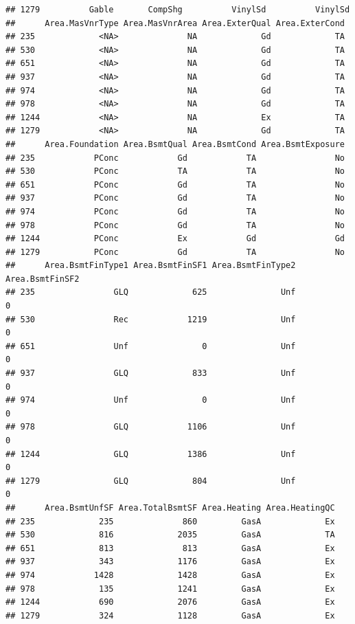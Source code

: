\documentclass[]{article}
\begin{document}
\begin{verbatim}
## 1279          Gable       CompShg          VinylSd          VinylSd
##      Area.MasVnrType Area.MasVnrArea Area.ExterQual Area.ExterCond
## 235             <NA>              NA             Gd             TA
## 530             <NA>              NA             Gd             TA
## 651             <NA>              NA             Gd             TA
## 937             <NA>              NA             Gd             TA
## 974             <NA>              NA             Gd             TA
## 978             <NA>              NA             Gd             TA
## 1244            <NA>              NA             Ex             TA
## 1279            <NA>              NA             Gd             TA
##      Area.Foundation Area.BsmtQual Area.BsmtCond Area.BsmtExposure
## 235            PConc            Gd            TA                No
## 530            PConc            TA            TA                No
## 651            PConc            Gd            TA                No
## 937            PConc            Gd            TA                No
## 974            PConc            Gd            TA                No
## 978            PConc            Gd            TA                No
## 1244           PConc            Ex            Gd                Gd
## 1279           PConc            Gd            TA                No
##      Area.BsmtFinType1 Area.BsmtFinSF1 Area.BsmtFinType2 Area.BsmtFinSF2
## 235                GLQ             625               Unf               0
## 530                Rec            1219               Unf               0
## 651                Unf               0               Unf               0
## 937                GLQ             833               Unf               0
## 974                Unf               0               Unf               0
## 978                GLQ            1106               Unf               0
## 1244               GLQ            1386               Unf               0
## 1279               GLQ             804               Unf               0
##      Area.BsmtUnfSF Area.TotalBsmtSF Area.Heating Area.HeatingQC
## 235             235              860         GasA             Ex
## 530             816             2035         GasA             TA
## 651             813              813         GasA             Ex
## 937             343             1176         GasA             Ex
## 974            1428             1428         GasA             Ex
## 978             135             1241         GasA             Ex
## 1244            690             2076         GasA             Ex
## 1279            324             1128         GasA             Ex

\end{verbatim}
\end{document}
